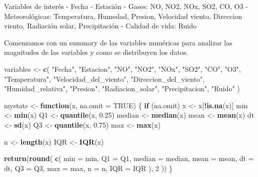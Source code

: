 \documentclass[notspecified,article,submit,moreauthors,pdftex]{Definitions/mdpi}
\newenvironment{Shaded}{\begin{snugshade}}{\end{snugshade}}
\newcommand{\AttributeTok}[1]{\textcolor[rgb]{0.13,0.29,0.53}{#1}}
\newcommand{\ConstantTok}[1]{\textcolor[rgb]{0.56,0.35,0.01}{#1}}
\newcommand{\ControlFlowTok}[1]{\textcolor[rgb]{0.13,0.29,0.53}{\textbf{#1}}}
\newcommand{\DecValTok}[1]{\textcolor[rgb]{0.00,0.00,0.81}{#1}}
\newcommand{\FloatTok}[1]{\textcolor[rgb]{0.00,0.00,0.81}{#1}}
\newcommand{\FunctionTok}[1]{\textcolor[rgb]{0.13,0.29,0.53}{\textbf{#1}}}
\newcommand{\NormalTok}[1]{#1}
\newcommand{\OtherTok}[1]{\textcolor[rgb]{0.56,0.35,0.01}{#1}}
\newcommand{\SpecialCharTok}[1]{\textcolor[rgb]{0.81,0.36,0.00}{\textbf{#1}}}
\newcommand{\StringTok}[1]{\textcolor[rgb]{0.31,0.60,0.02}{#1}}
\begin{document}
Variables de interés - Fecha - Estación - Gases: NO, NO2, NOx, SO2, CO,
O3 - Meteorológicas: Temperatura, Humedad, Presion, Velocidad viento,
Direccion viento, Radiación solar, Precipitación - Calidad de vida:
Ruido

Comenzamos con un summary de las variables numéricas para analizar las
magnitudes de las variables y como se distribuyen los datos.

\begin{Shaded}
\begin{Highlighting}[]
\NormalTok{variables }\OtherTok{\textless{}{-}}
  \FunctionTok{c}\NormalTok{(}
    \StringTok{"Fecha"}\NormalTok{,}
    \StringTok{"Estacion"}\NormalTok{,}
    \StringTok{"NO"}\NormalTok{,}
    \StringTok{"NO2"}\NormalTok{,}
    \StringTok{"NOx"}\NormalTok{,}
    \StringTok{"SO2"}\NormalTok{,}
    \StringTok{"CO"}\NormalTok{,}
    \StringTok{"O3"}\NormalTok{,}
    \StringTok{"Temperatura"}\NormalTok{,}
    \StringTok{"Velocidad\_del\_viento"}\NormalTok{,}
    \StringTok{"Direccion\_del\_viento"}\NormalTok{,}
    \StringTok{"Humidad\_relativa"}\NormalTok{,}
    \StringTok{"Presion"}\NormalTok{,}
    \StringTok{"Radiacion\_solar"}\NormalTok{,}
    \StringTok{"Precipitacion"}\NormalTok{,}
    \StringTok{"Ruido"}
\NormalTok{  )}

\NormalTok{mystats }\OtherTok{\textless{}{-}} \ControlFlowTok{function}\NormalTok{(x, }\AttributeTok{na.omit =} \ConstantTok{TRUE}\NormalTok{) \{}
  \ControlFlowTok{if}\NormalTok{ (na.omit)}
\NormalTok{    x }\OtherTok{\textless{}{-}}\NormalTok{ x[}\SpecialCharTok{!}\FunctionTok{is.na}\NormalTok{(x)]}
\NormalTok{  min }\OtherTok{\textless{}{-}} \FunctionTok{min}\NormalTok{(x)}
\NormalTok{  Q1 }\OtherTok{\textless{}{-}} \FunctionTok{quantile}\NormalTok{(x, }\FloatTok{0.25}\NormalTok{)}
\NormalTok{  median }\OtherTok{\textless{}{-}} \FunctionTok{median}\NormalTok{(x)}
\NormalTok{  mean }\OtherTok{\textless{}{-}} \FunctionTok{mean}\NormalTok{(x)}
\NormalTok{  dt }\OtherTok{\textless{}{-}} \FunctionTok{sd}\NormalTok{(x)}
\NormalTok{  Q3 }\OtherTok{\textless{}{-}} \FunctionTok{quantile}\NormalTok{(x, }\FloatTok{0.75}\NormalTok{)}
\NormalTok{  max }\OtherTok{\textless{}{-}} \FunctionTok{max}\NormalTok{(x)}
  
\NormalTok{  n }\OtherTok{\textless{}{-}} \FunctionTok{length}\NormalTok{(x)}
\NormalTok{  IQR }\OtherTok{\textless{}{-}} \FunctionTok{IQR}\NormalTok{(x)}
  
  \FunctionTok{return}\NormalTok{(}\FunctionTok{round}\NormalTok{(}
    \FunctionTok{c}\NormalTok{(}
      \AttributeTok{min =}\NormalTok{ min,}
      \AttributeTok{Q1 =}\NormalTok{ Q1,}
      \AttributeTok{median =}\NormalTok{ median,}
      \AttributeTok{mean =}\NormalTok{ mean,}
      \AttributeTok{dt =}\NormalTok{ dt,}
      \AttributeTok{Q3 =}\NormalTok{ Q3,}
      \AttributeTok{max =}\NormalTok{ max,}
      \AttributeTok{n =}\NormalTok{ n,}
      \AttributeTok{IQR =}\NormalTok{ IQR}
\NormalTok{    ),}
    \DecValTok{2}
\NormalTok{  ))}
\NormalTok{\}}


\end{Highlighting}
\end{Shaded}
\end{document}
